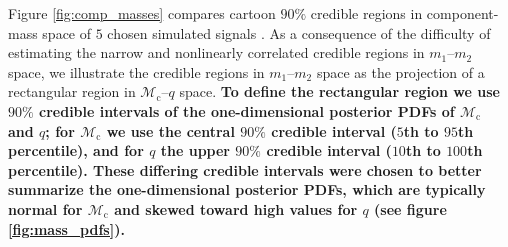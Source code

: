 Figure \ref{fig:comp_masses} compares cartoon $90\%$ credible regions in component-mass space of $5$ chosen simulated signals \cite[cf.]{Hannam_2013,Chatziioannou_2014}.  As a consequence of the difficulty of estimating the narrow and nonlinearly correlated credible regions in $m_1$--$m_2$ space, we illustrate the credible regions in $m_1$--$m_2$ space as the projection of a rectangular region in $\mathcal{M}_\mathrm{c}$--$q$ space.  \textbf{To define the rectangular region we use $90\%$ credible intervals of the one-dimensional posterior PDFs of $\mathcal{M}_\mathrm{c}$ and $q$; for $\mathcal{M}_\mathrm{c}$ we use the central $90\%$ credible interval ($5$th to $95$th percentile), and for $q$ the upper $90\%$ credible interval ($10$th to $100$th percentile).  These differing credible intervals were chosen to better summarize the one-dimensional posterior PDFs, which are typically normal for $\mathcal{M}_\mathrm{c}$ and skewed toward high values for $q$ (see figure \ref{fig:mass_pdfs}).}